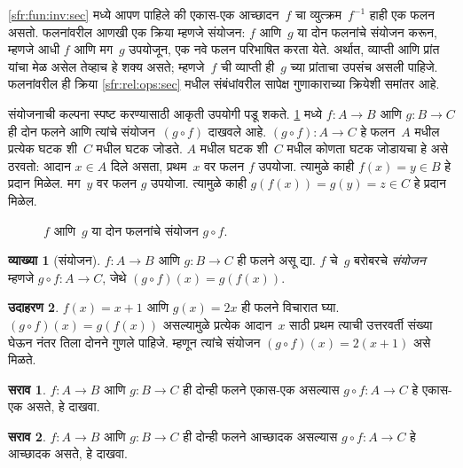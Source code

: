 \documentclass[11pt,a4paper,openany]{book}
\theoremstyle{definition}
\newtheorem{defn}{व्याख्या}[section]
\newtheorem{ex}[defn]{उदाहरण}
\newtheorem{prob}{सराव}[chapter]
\newenvironment{explain}{}{}
\newcommand{\olasset}[2][0.52\textwidth]{\centering\resizebox{#1}{!}{}}
\newcommand{\comp}[2]{#2\circ #1}
\newlength{\olphotowidth}\setlength{\olphotowidth}{0.35\textwidth}
\begin{document}
\begin{explain}
\ref{sfr:fun:inv:sec} मध्ये आपण पाहिले की
एकास-एक आच्छादन~$f$ चा व्युत्क्रम~$f^{-1}$ हाही एक फलन असतो.
फलनांवरील आणखी एक क्रिया म्हणजे संयोजन: $f$ आणि~$g$ या दोन
फलनांचे संयोजन करून, म्हणजे आधी $f$ आणि मग~$g$ उपयोजून,
एक नवे फलन परिभाषित करता येते. अर्थात, व्याप्ती आणि प्रांत यांचा मेळ
असेल तेव्हाच हे शक्य असते; म्हणजे~$f$ ची व्याप्ती ही~$g$ च्या प्रांताचा
उपसंच असली पाहिजे. फलनांवरील ही क्रिया
\ref{sfr:rel:ops:sec} मधील संबंधांवरील सापेक्ष गुणाकाराच्या क्रियेशी
समांतर आहे.

संयोजनाची कल्पना स्पष्ट करण्यासाठी आकृती उपयोगी पडू शकते.
\ref{sfr:fun:cmp:fig:composition} मध्ये $f \colon A \to B$ आणि $g \colon B \to C$
ही दोन फलने आणि त्यांचे संयोजन~$(\comp{f}{g})$ दाखवले आहे.
$(\comp{f}{g}) \colon A \to C$ हे फलन~$A$ मधील प्रत्येक घटक
शी~$C$ मधील घटक जोडते. $A$ मधील घटक शी~$C$
मधील कोणता घटक जोडायचा हे असे ठरवतो: आदान $x \in A$
दिले असता, प्रथम~$x$ वर फलन $f$ उपयोजा. त्यामुळे काही
$f(x) = y \in B$ हे प्रदान मिळेल. मग~$y$ वर फलन $g$ उपयोजा.
त्यामुळे काही $g(f(x)) = g(y) = z \in C$ हे प्रदान मिळेल.
\begin{figure}
  \olasset[2\olphotowidth]{assets/diagrams/composition.tikz}
  \caption{$f$ आणि~$g$ या दोन फलनांचे संयोजन $g \circ f$.}
  \label{sfr:fun:cmp:fig:composition}
\end{figure}
\end{explain}

\begin{defn}[संयोजन]
$f\colon A \to B$ आणि $g\colon B \to C$ ही फलने असू द्या.
$f$ चे~$g$ बरोबरचे \emph{संयोजन} म्हणजे $\comp{f}{g} \colon A \to C$,
जेथे $(\comp{f}{g})(x) = g(f(x))$.
\end{defn}

\begin{ex}
$f(x) = x + 1$ आणि $g(x) = 2x$ ही फलने विचारात घ्या.
$(\comp{f}{g})(x) = g(f(x))$ असल्यामुळे प्रत्येक आदान~$x$ साठी
प्रथम त्याची उत्तरवर्ती संख्या घेऊन नंतर तिला दोनने गुणले पाहिजे.
म्हणून त्यांचे संयोजन $(\comp{f}{g})(x) = 2(x+1)$ असे मिळते.
\end{ex}

\begin{prob}
$f \colon A \to B$ आणि $g \colon B \to C$ ही दोन्ही फलने
एकास-एक असल्यास $\comp{f}{g}\colon A \to C$ हे
एकास-एक असते, हे दाखवा.
\end{prob}

\begin{prob}
$f \colon A \to B$ आणि $g \colon B \to C$ ही दोन्ही फलने
आच्छादक असल्यास $\comp{f}{g}\colon A \to C$ हे
आच्छादक असते, हे दाखवा.
\end{prob}
\end{document}
